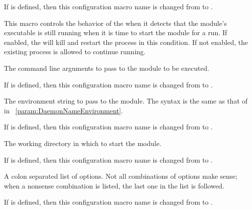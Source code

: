 \begin{description}
    If 
    is defined, then this configuration macro name is changed from
     to
    .

    This macro controls the behavior of the  when it
    detects that the module's executable is still running when it is time
    to start the module for a run. 	If enabled, the
     will kill and restart the process in this
    condition.  If not enabled, the existing process is allowed to
    continue running. 

\item[\Macro{STARTD\_CRON\_<ModuleName>\_ARGS}]
\label{param:StartdCronModuleArgs}
    The command line arguments to pass to the module to be executed. 

    If 
    is defined, then this configuration macro name is changed from
     to
    .

\item[\Macro{STARTD\_CRON\_<ModuleName>\_ENV}]
\label{param:StartdCronModuleEnv}
    The environment string to pass to the module.
    The syntax is the same as that of 
     in ~\ref{param:DaemonNameEnvironment}.

    If 
    is defined, then this configuration macro name is changed from
     to
    .

\item[\Macro{STARTD\_CRON\_modulename\_CWD}]
\label{param:StartdCronModuleCwd}
    The working directory in which to start the module.

    If 
    is defined, then this configuration macro name is changed from
     to
    .

\item[\Macro{STARTD\_CRON\_modulename\_OPTIONS}]
\label{param:StartdCronModuleOptions}
    A colon separated list of options. 
    Not all combinations of options make sense;
    when a nonsense combination is listed,
    the last one in the list is followed.

    If 
    is defined, then this configuration macro name is changed from
     to
    .


\end{description}
